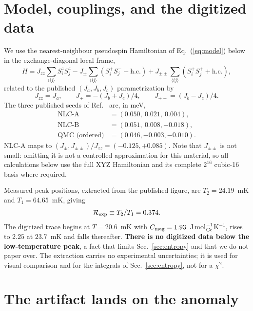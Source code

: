 \documentclass[aps,prb,preprint,amsmath,amssymb,superscriptaddress,
longbibliography,floatfix]{revtex4-2}
\newcommand{\Jzz}{J_{zz}}
\newcommand{\Jpm}{J_{\pm}}
\newcommand{\Jpmpm}{J_{\pm\pm}}
\begin{document}
\section{Model, couplings, and the digitized data}
\label{sec:model}

We use the nearest-neighbour pseudospin Hamiltonian of
Eq.~(\ref{eq:model}) below in the exchange-diagonal local frame,
\begin{equation}
 H=\Jzz\!\!\sum_{\langle ij\rangle}\!S^z_iS^z_j
 -\Jpm\!\!\sum_{\langle ij\rangle}\!\left(S^+_iS^-_j+\mathrm{h.c.}\right)
 +\Jpmpm\!\!\sum_{\langle ij\rangle}\!\left(S^+_iS^+_j+\mathrm{h.c.}\right),
 \label{eq:model}
\end{equation}
related to the published $(J_a,J_b,J_c)$ parametrization by
\begin{equation}
 \Jzz=J_a,\qquad \Jpm=-(J_b+J_c)/4,\qquad \Jpmpm=(J_b-J_c)/4 .
\end{equation}
The three published seeds of Ref.~\cite{Smith2025} are, in meV,
\begin{equation}
 \begin{aligned}
  \text{NLC-A}&=(0.050,\ 0.021,\ 0.004),\\
  \text{NLC-B}&=(0.051,\ 0.008,-0.018),\\
  \text{QMC (ordered)}&=(0.046,-0.003,-0.010).
 \end{aligned}
\end{equation}
NLC-A maps to $(\Jpm,\Jpmpm)/\Jzz=(-0.125,+0.085)$.  Note that $\Jpmpm$ is not
small: omitting it is not a controlled approximation for this material, so all
calculations below use the full XYZ Hamiltonian and its complete $2^{16}$
cubic-16 basis where required.

Measured peak positions, extracted from the published figure, are
$T_2=24.19$~mK and $T_1=64.65$~mK, giving
\begin{equation}
 \mathcal R_{\rm exp}\equiv T_2/T_1=0.374 .
 \label{eq:Rexp}
\end{equation}
The digitized trace begins at $T=20.6$~mK with
$C_{\rm mag}=1.93$~J\,mol$_{\rm Ce}^{-1}$K$^{-1}$, rises to $2.25$ at
$23.7$~mK and falls thereafter.  \textbf{There is no digitized data below the
low-temperature peak}, a fact that limits Sec.~\ref{sec:entropy} and that we do
not paper over.  The extraction carries no experimental uncertainties; it is
used for visual comparison and for the integrals of Sec.~\ref{sec:entropy}, not
for a $\chi^2$.

\section{The artifact lands on the anomaly}
\label{sec:artifact}
\end{document}
